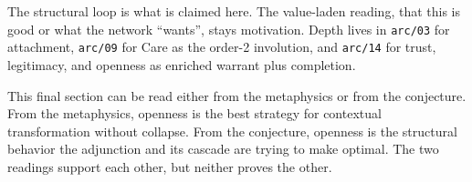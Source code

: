 \documentclass[11pt]{article}
\begin{document}
The structural loop is what is claimed here. The value-laden reading, that
this is good or what the network ``wants'', stays motivation. Depth lives in
\texttt{arc/03} for attachment, \texttt{arc/09} for Care as the order-2
involution, and \texttt{arc/14} for trust, legitimacy, and openness as enriched
warrant plus completion.

This final section can be read either from the metaphysics or from the
conjecture. From the metaphysics, openness is the best strategy for contextual
transformation without collapse. From the conjecture, openness is the
structural behavior the adjunction and its cascade are trying to make optimal.
The two readings support each other, but neither proves the other.
\end{document}
